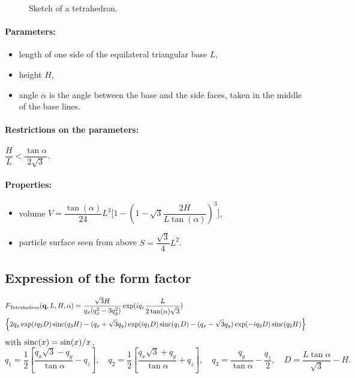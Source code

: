 \begin{figure}[ht]
\begin{center}
\caption{Sketch of a tetrahedron.}
\end{center}
\label{tetrahedron}
\end{figure}

\paragraph{Parameters:}
\begin{itemize}
\item length of one side of the equilateral triangular base $L$,
\item height $H$,
\item angle $\alpha$ is the angle between the base and the
  side faces, taken in the middle of the base lines.
\end{itemize}

\paragraph{Restrictions on the parameters:} $\dfrac{H}{L}< \dfrac{\tan{\alpha}}{2\sqrt{3}}$.

\paragraph{Properties:}
\begin{itemize}
\item volume $V= \dfrac{\tan(\alpha)}{24} L^3\Big[1- (1 -
  \sqrt{3}\dfrac{2H}{L \tan(\alpha)} )^3\Big]$,
\item particle surface seen from above $S =\dfrac{\sqrt{3}}{4}L^2$.
\end{itemize}

\subsection{Expression of the form factor}

\begin{align*}
&F_{\rm{Tetrahedron}} (\mathbf{q}, L, H, \alpha)=\frac{\sqrt{3}H}{q_x (q_x^2-3q_y^2)}
\exp(iq_z \frac{L}{2\tan (\alpha)\sqrt{3}})\\
&\Big\{2q_x \exp(iq_3 D)\operatorname{sinc}(q_3 H) - (q_x +\sqrt{3}q_y)
\exp(iq_1 D)\operatorname{sinc}(q_1 D) -(q_x-\sqrt{3}q_y)\exp(-iq_2
D)\operatorname{sinc}(q_2 H) \Big\} 
\end{align*}
with $\operatorname{sinc}(x)=\sin(x)/x$,
\begin{equation*}
q_1  =\frac{1}{2}\left[\frac{q_x\sqrt{3} -q_y}{\tan \alpha}-q_z \right],
\quad q_2 = \frac{1}{2}\left[\frac{q_x\sqrt{3} +q_y}{\tan \alpha}+q_z
\right], \quad 
q_3 = \frac{q_y}{\tan \alpha} -\frac{q_z}{2}, \quad D = \frac{L \tan \alpha}{\sqrt{3}} -H.
\end{equation*}

